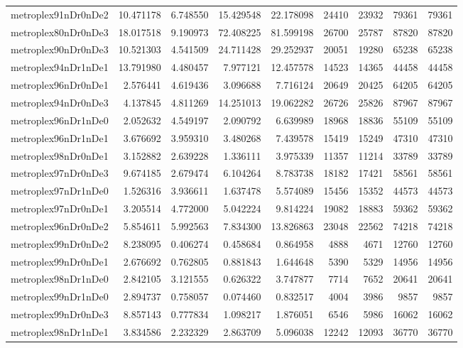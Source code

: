 \begin{longtable}{|l|r|r|r|r|r|r|r|r|}
metroplex91nDr0nDe2 & 10.471178 & 6.748550 & 15.429548 & 22.178098 & 24410 & 23932 & 79361 & 79361 \\
metroplex80nDr0nDe3 & 18.017518 & 9.190973 & 72.408225 & 81.599198 & 26700 & 25787 & 87820 & 87820 \\
metroplex90nDr0nDe3 & 10.521303 & 4.541509 & 24.711428 & 29.252937 & 20051 & 19280 & 65238 & 65238 \\
metroplex94nDr1nDe1 & 13.791980 & 4.480457 & 7.977121 & 12.457578 & 14523 & 14365 & 44458 & 44458 \\
metroplex96nDr0nDe1 & 2.576441 & 4.619436 & 3.096688 & 7.716124 & 20649 & 20425 & 64205 & 64205 \\
metroplex94nDr0nDe3 & 4.137845 & 4.811269 & 14.251013 & 19.062282 & 26726 & 25826 & 87967 & 87967 \\
metroplex96nDr1nDe0 & 2.052632 & 4.549197 & 2.090792 & 6.639989 & 18968 & 18836 & 55109 & 55109 \\
metroplex96nDr1nDe1 & 3.676692 & 3.959310 & 3.480268 & 7.439578 & 15419 & 15249 & 47310 & 47310 \\
metroplex98nDr0nDe1 & 3.152882 & 2.639228 & 1.336111 & 3.975339 & 11357 & 11214 & 33789 & 33789 \\
metroplex97nDr0nDe3 & 9.674185 & 2.679474 & 6.104264 & 8.783738 & 18182 & 17421 & 58561 & 58561 \\
metroplex97nDr1nDe0 & 1.526316 & 3.936611 & 1.637478 & 5.574089 & 15456 & 15352 & 44573 & 44573 \\
metroplex97nDr0nDe1 & 3.205514 & 4.772000 & 5.042224 & 9.814224 & 19082 & 18883 & 59362 & 59362 \\
metroplex96nDr0nDe2 & 5.854611 & 5.992563 & 7.834300 & 13.826863 & 23048 & 22562 & 74218 & 74218 \\
metroplex99nDr0nDe2 & 8.238095 & 0.406274 & 0.458684 & 0.864958 & 4888 & 4671 & 12760 & 12760 \\
metroplex99nDr0nDe1 & 2.676692 & 0.762805 & 0.881843 & 1.644648 & 5390 & 5329 & 14956 & 14956 \\
metroplex98nDr1nDe0 & 2.842105 & 3.121555 & 0.626322 & 3.747877 & 7714 & 7652 & 20641 & 20641 \\
metroplex99nDr1nDe0 & 2.894737 & 0.758057 & 0.074460 & 0.832517 & 4004 & 3986 & 9857 & 9857 \\
metroplex99nDr0nDe3 & 8.857143 & 0.777834 & 1.098217 & 1.876051 & 6546 & 5986 & 16062 & 16062 \\
metroplex98nDr1nDe1 & 3.834586 & 2.232329 & 2.863709 & 5.096038 & 12242 & 12093 & 36770 & 36770 \\

\end{longtable}

